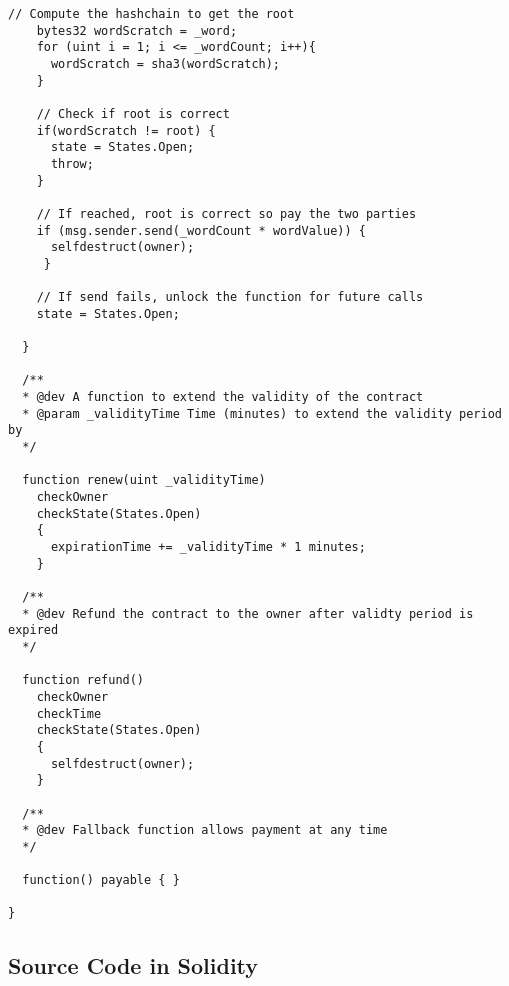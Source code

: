 \begin{lstlisting}[basicstyle=\scriptsize\ttfamily]
    // Compute the hashchain to get the root
    bytes32 wordScratch = _word;
    for (uint i = 1; i <= _wordCount; i++){
      wordScratch = sha3(wordScratch);
    }

    // Check if root is correct
    if(wordScratch != root) {
      state = States.Open;
      throw;
    }

    // If reached, root is correct so pay the two parties
    if (msg.sender.send(_wordCount * wordValue)) {
      selfdestruct(owner);
     }

    // If send fails, unlock the function for future calls
    state = States.Open;

  }

  /**
  * @dev A function to extend the validity of the contract
  * @param _validityTime Time (minutes) to extend the validity period by
  */

  function renew(uint _validityTime)
    checkOwner
    checkState(States.Open)
    {
      expirationTime += _validityTime * 1 minutes;
    }

  /**
  * @dev Refund the contract to the owner after validty period is expired
  */

  function refund()
    checkOwner
    checkTime
    checkState(States.Open)
    {
      selfdestruct(owner);
    }

  /**
  * @dev Fallback function allows payment at any time
  */

  function() payable { }

}
\end{lstlisting}

\clearpage

\subsection{\eww Source Code in Solidity}
\label{sec:code}

